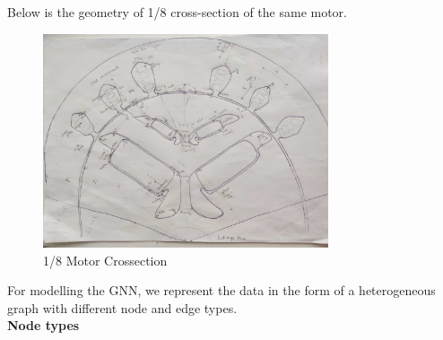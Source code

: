 \documentclass{report} %
\begin{document}
Below is the geometry of 1/8 cross-section of the same motor.

\begin{figure}[h]
    \centering
    \includegraphics[width=0.75\textwidth]{./ReportImages/EMCrosssection.jpg} 
    \caption{1/8 Motor Crossection}
    \label{fig:1/8 Motor Crossection}
\end{figure}

\newpage 

For modelling the GNN, we represent the data in the form of a heterogeneous graph with different node and edge types.\\



\textbf{Node types}
\end{document}
